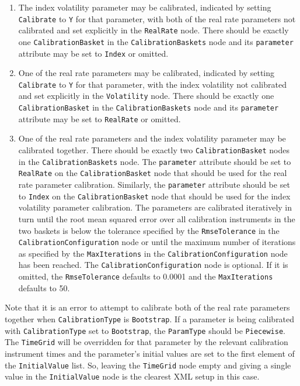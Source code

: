 \begin{enumerate}
\item
The index volatility parameter may be calibrated, indicated by setting \lstinline!Calibrate! to \lstinline!Y! for that parameter, with both of the real rate parameters not calibrated
and set explicitly in the \lstinline!RealRate! node. There should be exactly one \lstinline!CalibrationBasket! in the \lstinline!CalibrationBaskets! node and its \lstinline!parameter!
attribute may be set to \lstinline!Index! or omitted.

\item
One of the real rate parameters may be calibrated, indicated by setting \lstinline!Calibrate! to \lstinline!Y! for that parameter, with the index volatility not calibrated and set
explicitly in the \lstinline!Volatility! node. There should be exactly one \lstinline!CalibrationBasket! in the \lstinline!CalibrationBaskets! node and its \lstinline!parameter!
attribute may be set to \lstinline!RealRate! or omitted.

\item
One of the real rate parameters and the index volatility parameter may be calibrated together. There should be exactly two \lstinline!CalibrationBasket! nodes in the \lstinline!CalibrationBaskets!
node. The \lstinline!parameter! attribute should be set to \lstinline!RealRate! on the \lstinline!CalibrationBasket! node that should be used for the real rate parameter calibration.
Similarly, the \lstinline!parameter! attribute should be set to \lstinline!Index! on the \lstinline!CalibrationBasket! node that should be used for the index volatility parameter calibration.
The parameters are calibrated iteratively in turn until the root mean squared error over all calibration instruments in the two baskets is below the tolerance specified by the
\lstinline!RmseTolerance! in the \lstinline!CalibrationConfiguration! node or until the maximum number of iterations as specified by the \lstinline!MaxIterations! in the
\lstinline!CalibrationConfiguration! node has been reached. The \lstinline!CalibrationConfiguration! node is optional. If it is omitted, the \lstinline!RmseTolerance! defaults to 0.0001 and the
\lstinline!MaxIterations! defaults to 50.

\end{enumerate}

Note that it is an error to attempt to calibrate both of the real rate parameters together when \lstinline!CalibrationType! is \lstinline!Bootstrap!. If a parameter is being calibrated
with \lstinline!CalibrationType! set to \lstinline!Bootstrap!, the \lstinline!ParamType! should be \lstinline!Piecewise!. The \lstinline!TimeGrid! will be overridden for that parameter by
the relevant calibration instrument times and the parameter's initial values are set to the first element of the \lstinline!InitialValue! list. So, leaving the \lstinline!TimeGrid! node
empty and giving a single value in the \lstinline!InitialValue! node is the clearest XML setup in this case.

